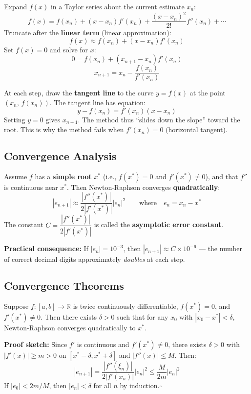 \documentclass[12pt]{article}
\begin{document}
\begin{derivbox}
Expand $f(x)$ in a Taylor series about the current estimate $x_n$:
\[
  f(x) = f(x_n) + (x - x_n)f'(x_n) + \frac{(x-x_n)^2}{2!}f''(x_n) + \cdots
\]
Truncate after the \textbf{linear term} (linear approximation):
\[
  f(x) \approx f(x_n) + (x - x_n)f'(x_n)
\]
Set $f(x) = 0$ and solve for $x$:
\[
  0 = f(x_n) + (x_{n+1} - x_n)f'(x_n)
\]
\[
  \boxed{x_{n+1} = x_n - \frac{f(x_n)}{f'(x_n)}}
\]
\end{derivbox}

\bigskip

\begin{defbox}
At each step, draw the \textbf{tangent line} to the curve $y = f(x)$ at the point $(x_n,\,f(x_n))$. The tangent line has equation:
\[
  y - f(x_n) = f'(x_n)(x - x_n)
\]
Setting $y = 0$ gives $x_{n+1}$. The method thus ``slides down the slope'' toward the root. This is why the method fails when $f'(x_n) = 0$ (horizontal tangent).
\end{defbox}

\bigskip

\subsection*{Convergence Analysis}

\begin{thmbox}
Assume $f$ has a \textbf{simple root} $x^*$ (i.e., $f(x^*) = 0$ and $f'(x^*) \neq 0$), and that $f''$ is continuous near $x^*$. Then Newton-Raphson converges \textbf{quadratically}:
\[
  |e_{n+1}| \approx \frac{|f''(x^*)|}{2|f'(x^*)|}|e_n|^2
  \qquad\text{where}\quad e_n = x_n - x^*
\]
The constant $C = \dfrac{|f''(x^*)|}{2|f'(x^*)|}$ is called the \textbf{asymptotic error constant}.

\medskip
\textbf{Practical consequence:} If $|e_n| = 10^{-3}$, then $|e_{n+1}| \approx C \times 10^{-6}$ --- the number of correct decimal digits approximately \textit{doubles} at each step.
\end{thmbox}

\bigskip

\subsection*{Convergence Theorems}

\begin{thmbox}
Suppose $f:[a,b]\to\mathbb{R}$ is twice continuously differentiable, $f(x^*)=0$, and $f'(x^*)\neq 0$. Then there exists $\delta>0$ such that for any $x_0$ with $|x_0-x^*|<\delta$, Newton-Raphson converges quadratically to $x^*$.

\medskip
\textbf{Proof sketch:} Since $f'$ is continuous and $f'(x^*)\neq 0$, there exists $\delta>0$ with $|f'(x)|\geq m>0$ on $[x^*-\delta,x^*+\delta]$ and $|f''(x)|\leq M$. Then:
\[
  |e_{n+1}| = \frac{|f''(\xi_n)|}{2|f'(x_n)|}|e_n|^2 \leq \frac{M}{2m}|e_n|^2
\]
If $|e_0|<2m/M$, then $|e_n|<\delta$ for all $n$ by induction.\hfill$\square$
\end{thmbox}
\end{document}
